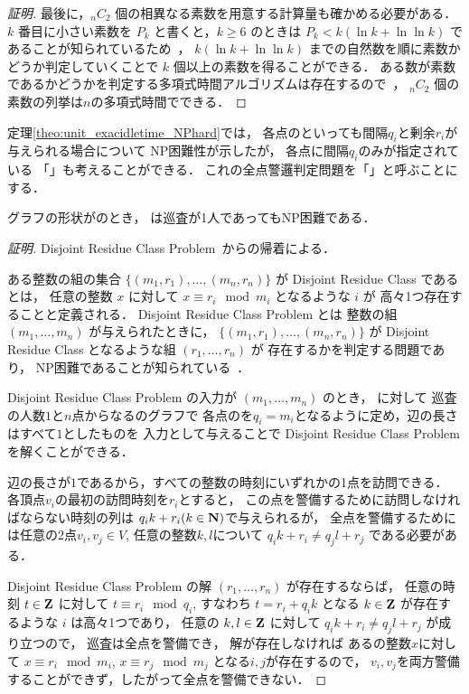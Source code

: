 \begin{proof}[証明]
  最後に，${}_n C_2$ 個の相異なる素数を用意する計算量も確かめる必要がある．
  $k$ 番目に小さい素数を $P_k$ と書くと，$k \geq 6$ のときは
  $P_k < k( \ln k + \ln\ln k )$ であることが知られているため~\cite{dusart1999k}，
  $k( \ln k + \ln\ln k )$ までの自然数を順に素数かどうか判定していくことで
  $k$ 個以上の素数を得ることができる．
  ある数が素数であるかどうかを判定する多項式時間アルゴリズムは存在するので~\cite{agrawal2004primes}，
  ${}_n C_2$ 個の素数の列挙は$n$の多項式時間でできる．
\end{proof}



定理\ref{theo:unit_exacidletime_NPhard}では，
各点の{\exactidletime}といっても間隔$q_i$と剰余$r_i$が与えられる場合について
NP困難性が示したが，
各点に間隔$q_i$のみが指定されている
「{\intervalSpecifiedPatProb}」も考えることができる．
これの全点警邏判定問題を「{\intervalSpecifiedPatProbDecision}」と呼ぶことにする．

\begin{theo}
  \label{theo:NPhard_disjoint_residue_class_problem}
  グラフの形状が{\graphUnit}のとき，
  {\intervalSpecifiedPatProbDecision}は巡査が1人であってもNP困難である．
\end{theo}


\begin{proof}[証明]
  Disjoint Residue Class Problem~\cite{kawamura2015simple}からの帰着による．

  ある整数の組の集合 $\{ (m_1, r_1), \ldots, (m_n, r_n) \}$ が
  Disjoint Residue Class であるとは，
  任意の整数 $x$ に対して $x \equiv r_i \mod m_i$ となるような $i$ が
  高々1つ存在することと定義される．
  Disjoint Residue Class Problem とは
  整数の組 $(m_1, \ldots, m_n)$ が与えられたときに，
  $\{ (m_1, r_1), \ldots, (m_n, r_n) \}$ が
  Disjoint Residue Class となるような組 $(r_1, \ldots, r_n)$ が
  存在するかを判定する問題であり，
  NP困難であることが知られている~\cite{kawamura2015simple}．

  Disjoint Residue Class Problem の入力が $(m_1, \ldots, m_n)$ のとき，
  {\intervalSpecifiedPatProb}に対して
  巡査の人数$1$と$n$点からなる{\graphUnit}のグラフで
  各点の{\exactinterval}を$q_i = m_i$となるように定め，辺の長さはすべて$1$としたものを
  入力として与えることで
  Disjoint Residue Class Problemを解くことができる．

  辺の長さが$1$であるから，すべての整数の時刻にいずれかの1点を訪問できる．
  各頂点$v_i$の最初の訪問時刻を$r_i$とすると，
  この点を警備するために訪問しなければならない時刻の列は
  $q_i k + r_i (k \in \mathbf N)$で与えられるが，
  全点を警備するためには任意の2点$v_i, v_j \in V$, 任意の整数$k,l$について
  $q_i k + r_i \neq q_j l + r_j$
  である必要がある．

  Disjoint Residue Class Problem の解 $(r_1, \ldots, r_n)$ が存在するならば，
  任意の時刻 $t \in \mathbf Z$ に対して $t \equiv r_i \mod q_i$, 
  すなわち $t = r_i + q_i k$ となる $k \in \mathbf Z$ が存在するような $i$ は高々1つであり，
  任意の $k,l \in \mathbf Z$ に対して $q_i k + r_i \neq q_j l + r_j$ が成り立つので，
  巡査は全点を警備でき，
  解が存在しなければ
  あるの整数$x$に対して $x \equiv r_i \mod m_i$, $x \equiv r_j \mod m_j$
  となる$i, j$が存在するので，
  $v_i, v_j$を両方警備することができず，したがって全点を警備できない．
\end{proof}
